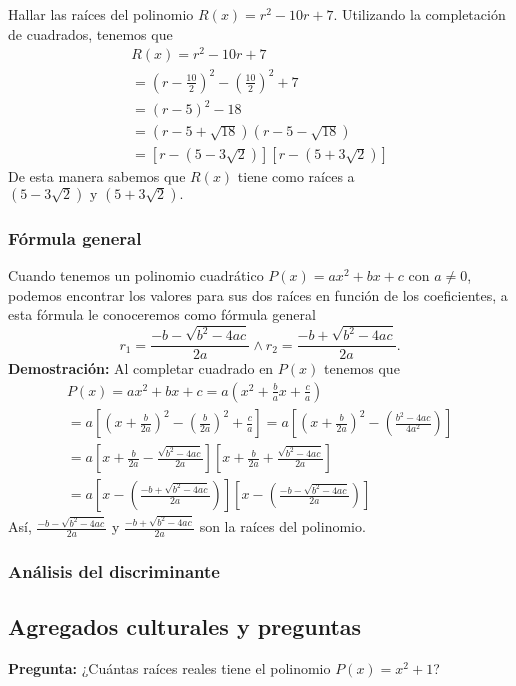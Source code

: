 {{        \begin{example}
            Hallar las raíces del polinomio $R(x) = r^2 - 10r + 7.$
            \exampleProof
            {
                Utilizando la completación de cuadrados, tenemos que
                \begin{gather*}
                    R(x) = r^2 - 10r + 7\\
                    = \left( r - \frac{10}{2} \right)^2 - \left( \frac{10}{2} \right)^2 + 7\\
                    = \left( r - 5 \right)^2 - 18\\
                    = \left( r - 5 + \sqrt {18} \right)\left( r - 5 - \sqrt {18} \right)\\
                    = \left[ r - \left( 5 - 3\sqrt {2} \right)\right]\left[ r - \left( 5 + 3\sqrt {2} \right)\right]
                \end{gather*}
                De esta manera sabemos que $R(x)$ tiene como raíces a $\left( 5 - 3\sqrt {2} \right) \mbox{ y } \left( 5 + 3\sqrt {2} \right).$
            }
        \end{example}
    }


\subsubsection{Fórmula general}
    {
        Cuando tenemos un polinomio cuadrático $P(x) = ax^2 + bx + c$ con $a \neq 0$, podemos encontrar los valores para sus dos raíces en función de los coeficientes, a esta fórmula le conoceremos como fórmula general \[r_1 = \frac{-b - \sqrt {b^2 - 4ac}}{2a} \land r_2 = \frac{-b + \sqrt {b^2 - 4ac}}{2a}.\]
        \textbf{Demostración:} Al completar cuadrado en $P(x)$ tenemos que
        \begin{gather*}
            P(x) = ax^2 + bx + c = a \left( x^2 + \frac{b}{a}x + \frac{c}{a} \right) \\
            = a \left[ \left( x + \frac{b}{2a} \right)^2 - \left( \frac{b}{2a} \right)^2 + \frac{c}{a} \right]
            = a \left[ \left( x + \frac{b}{2a} \right)^2 - \left( \frac{b^2 - 4ac}{4a^2}\right) \right] \\
            = a \left[ x + \frac{b}{2a} - \frac{\sqrt {b^2 - 4ac}}{2a}\right]\left[ x + \frac{b}{2a} + \frac{\sqrt {b^2 - 4ac}}{2a}\right] \\
            = a \left[ x - \left( \frac{-b + \sqrt {b^2 - 4ac}}{2a} \right) \right]\left[ x - \left( \frac{-b - \sqrt {b^2 - 4ac}}{2a} \right) \right]
        \end{gather*}
        Así, $\frac{-b - \sqrt {b^2 - 4ac}}{2a}$ y $\frac{-b + \sqrt {b^2 - 4ac}}{2a}$ son la raíces del polinomio.
    }

    \subsubsection{Análisis del discriminante}
    {
    }
}
\label{subsec:determinar-raices}

\subsection{Agregados culturales y preguntas}
{
    \textbf{Pregunta:} ¿Cuántas raíces reales tiene el polinomio $P(x) = x^2+1$?

}\label{subsec:agregados-culturales}
